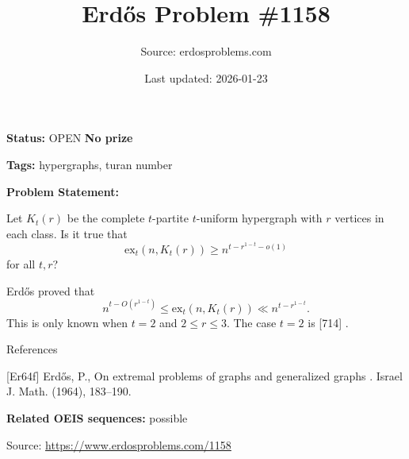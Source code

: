 \documentclass{article}
\title{Erd\H{o}s Problem \#1158}
\date{Last updated: 2026-01-23}
\author{Source: erdosproblems.com}
\begin{document}
\maketitle

\noindent\textbf{Status:} OPEN \quad \textbf{No prize}

\noindent\textbf{Tags:} hypergraphs, turan number

\medskip

\noindent\textbf{Problem Statement:}

Let $K_{t}(r)$ be the complete $t$-partite $t$-uniform hypergraph with $r$ vertices in each class. Is it true that\[\mathrm{ex}_t(n,K_t(r)) \geq n^{t-r^{1-t}-o(1)}\]for all $t,r$?




Erd\H{o}s \cite{Er64f} proved that\[n^{t-O(r^{1-t})}\leq \mathrm{ex}_t(n,K_t(r)) \ll n^{t-r^{1-t}}.\]This is only known when $t=2$ and $2\leq r\leq 3$. The case $t=2$ is [714] .




References

[Er64f] Erd\H{o}s, P., On extremal problems of graphs and generalized graphs . Israel J. Math. (1964), 183--190.

\noindent\textbf{Related OEIS sequences:} possible


\bigskip
\noindent\small{Source: \url{https://www.erdosproblems.com/1158}}
\end{document}

